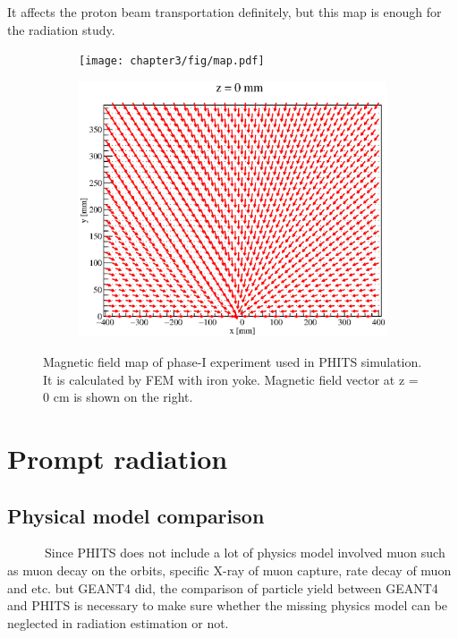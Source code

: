 It affects the proton beam transportation definitely, but this map is enough for the radiation study.
 \begin{figure}[H]
  \begin{subfigure}{0.3\textwidth}
   \centering
   \texttt{[image: chapter3/fig/map.pdf]}
  \end{subfigure}
  \hspace{0.2\textwidth}
  \begin{subfigure}{0.3\textwidth}
   \centering
   \includegraphics[scale=0.35]{chapter3/fig/fieldxy}
  \end{subfigure}
  \caption{Magnetic field map of phase-I experiment used in PHITS simulation. It is calculated by FEM with iron yoke. Magnetic field vector at z = 0 cm is shown on the right.}
  \label{field}
 \end{figure}

 \section{Prompt radiation}
  \subsection{Physical model comparison}
~~~~~~Since PHITS does not include a lot of physics model involved muon such as muon decay on the orbits, specific X-ray of muon capture, rate decay of muon and etc. but GEANT4 did, the comparison of particle yield between GEANT4 and PHITS is necessary to make sure whether the missing physics model can be neglected in radiation estimation or not.

